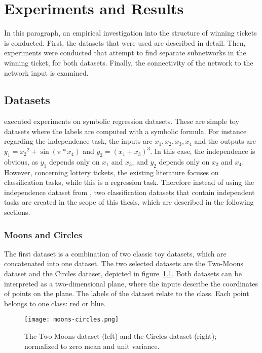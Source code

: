 \chapter{Experiments and Results}\label{chapter:experiments} 
In this paragraph, an empirical investigation into the structure of winning tickets is conducted.
First, the datasets that were used are described in detail.
Then, experiments were conducted that attempt to find separate subnetworks in the winning ticket, for both datasets.
Finally, the connectivity of the network to the network input is examined.

\section{Datasets}
\textcite{BIMT} executed experiments on symbolic regression datasets.
These are simple toy datasets where the labels are computed with a symbolic formula. 
For instance regarding the independence task, the inputs are $x_1, x_2, x_3, x_4$ and the outputs are $y_1={x_2}^2 + \sin{(\pi*x_4)}$ and $y_2={(x_1+x_3)}^3$.
In this case, the independence is obvious, as $y_1$ depends only on $x_1$ and $x_3$, and $y_2$ depends only on $x_2$ and $x_4$.
However, concerning lottery tickets, the existing literature focuses on classification tasks, while this is a regression task.
Therefore instead of using the independence dataset from \autocite{BIMT}, 
two classification datasets that contain independent tasks are created in the scope of this thesis, which are described in the following sections.

\subsection{Moons and Circles}\label{sec:independece_dataset}
The first dataset is a combination of two classic toy datasets, which are concatenated into one dataset.
The two selected datasets are the Two-Moons dataset and the Circles dataset, depicted in figure~\ref{fig:moons_circles}.
Both datasets can be interpreted as a two-dimensional plane, where the inputs describe the coordinates of points on the plane. 
The labels of the dataset relate to the class.
Each point belongs to one class: red or blue.

\begin{figure}[ht]
\centering \texttt{[image: moons-circles.png]}
\caption[Two-Moons and Circles Dataset]{
    The Two-Moons-dataset (left) and the Circles-dataset (right); normalized to zero mean and unit variance.}\label{fig:moons_circles}
\end{figure}

